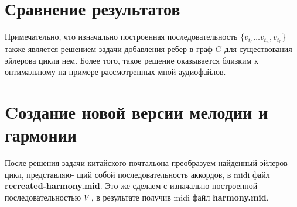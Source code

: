 \documentclass[a4paper,11pt]{article}
\begin{document}
	\section*{Сравнение результатов}
	Примечательно, что изначально построенная последовательность $\{v_{t_0} \ldots v_{t_n}, v_{t_0}\}$ также является решением задачи добавления ребер в граф $G$ для существования эйлерова цикла нем. Более того, такое решение оказывается близким к оптимальному на примере рассмотренных мной аудиофайлов.
	\section*{Cоздание новой версии мелодии и гармонии}
	После решения задачи китайского почтальона преобразуем найденный эйлеров цикл, представляю- щий собой последовательность аккордов, в midi файл \textbf{recreated-harmony.mid}. Это же сделаем с изначально построенной последовательностью $V$ , в результате получив midi файл \textbf{harmony.mid}.
\end{document}
